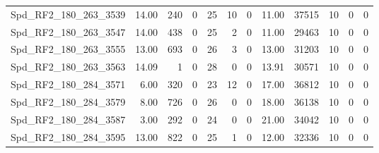 \begin{longtable}[c]{@{}lrrrrrrrrrrr@{}}
Spd\_RF2\_180\_263\_3539     & 14.00                  & 240                     & 0                       & 25                     & 10                      & 0                       & 11.00                   & 37515                    & 10                       & 0                        & 0                        \\
Spd\_RF2\_180\_263\_3547     & 14.00                  & 438                     & 0                       & 25                     & 2                       & 0                       & 11.00                   & 29463                    & 10                       & 0                        & 0                        \\
Spd\_RF2\_180\_263\_3555     & 13.00                  & 693                     & 0                       & 26                     & 3                       & 0                       & 13.00                   & 31203                    & 10                       & 0                        & 0                        \\
Spd\_RF2\_180\_263\_3563     & 14.09                  & 1                       & 0                       & 28                     & 0                       & 0                       & 13.91                   & 30571                    & 10                       & 0                        & 0                        \\
Spd\_RF2\_180\_284\_3571     & 6.00                   & 320                     & 0                       & 23                     & 12                      & 0                       & 17.00                   & 36812                    & 10                       & 0                        & 0                        \\
Spd\_RF2\_180\_284\_3579     & 8.00                   & 726                     & 0                       & 26                     & 0                       & 0                       & 18.00                   & 36138                    & 10                       & 0                        & 0                        \\
Spd\_RF2\_180\_284\_3587     & 3.00                   & 292                     & 0                       & 24                     & 0                       & 0                       & 21.00                   & 34042                    & 10                       & 0                        & 0                        \\
Spd\_RF2\_180\_284\_3595     & 13.00                  & 822                     & 0                       & 25                     & 1                       & 0                       & 12.00                   & 32336                    & 10                       & 0                        & 0                        \\

\end{longtable}
